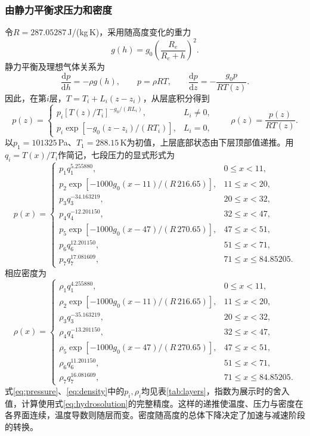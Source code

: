 \documentclass[11pt,a4paper]{article}
\begin{document}
\subsubsection{由静力平衡求压力和密度}
令$R=287.05287$\,J/(kg\,K)，采用随高度变化的重力
\begin{equation}
 g(h)=g_0\left(\frac{R_e}{R_e+h}\right)^2.
 \label{eq:gravity}
\end{equation}
静力平衡及理想气体关系为
\begin{equation}
 \frac{\mathrm dp}{\mathrm dh}=-\rho g(h),\qquad p=\rho RT,
 \qquad \frac{\mathrm dp}{\mathrm dz}=-\frac{g_0p}{RT(z)}.
 \label{eq:hydro}
\end{equation}
因此，在第$i$层，$T=T_i+L_i(z-z_i)$，从层底积分得到
\begin{equation}
 p(z)=\begin{cases}
 p_i[T(z)/T_i]^{-g_0/(RL_i)},&L_i\ne0,\\
 p_i\exp[-g_0(z-z_i)/(RT_i)],&L_i=0,
 \end{cases}\qquad \rho(z)=\frac{p(z)}{RT(z)}.
 \label{eq:hydrosolution}
\end{equation}
以$p_1=101325$\,Pa、$T_1=288.15$\,K为初值，上层底部状态由下层顶部值递推。用$q_i=T(x)/T_i$作简记，七段压力的显式形式为
\begin{equation}
 p(x)=\begin{cases}
 p_1q_1^{5.255880},&0\le x<11,\\
 p_2\exp[-1000g_0(x-11)/(R\,216.65)],&11\le x<20,\\
 p_3q_3^{-34.163219},&20\le x<32,\\
 p_4q_4^{-12.201150},&32\le x<47,\\
 p_5\exp[-1000g_0(x-47)/(R\,270.65)],&47\le x<51,\\
 p_6q_6^{12.201150},&51\le x<71,\\
 p_7q_7^{17.081609},&71\le x\le84.85205.
 \end{cases}\label{eq:pressure}
\end{equation}
相应密度为
\begin{equation}
 \rho(x)=\begin{cases}
 \rho_1q_1^{4.255880},&0\le x<11,\\
 \rho_2\exp[-1000g_0(x-11)/(R\,216.65)],&11\le x<20,\\
 \rho_3q_3^{-35.163219},&20\le x<32,\\
 \rho_4q_4^{-13.201150},&32\le x<47,\\
 \rho_5\exp[-1000g_0(x-47)/(R\,270.65)],&47\le x<51,\\
 \rho_6q_6^{11.201150},&51\le x<71,\\
 \rho_7q_7^{16.081609},&71\le x\le84.85205.
 \end{cases}\label{eq:density}
\end{equation}
式\eqref{eq:pressure}、\eqref{eq:density}中的$p_i,\rho_i$均见表\ref{tab:layers}，指数为展示时的舍入值，计算使用式\eqref{eq:hydrosolution}的完整精度。这样的递推使温度、压力与密度在各界面连续，温度导数则随层而变。密度随高度的总体下降决定了加速与减速阶段的转换。
\end{document}
